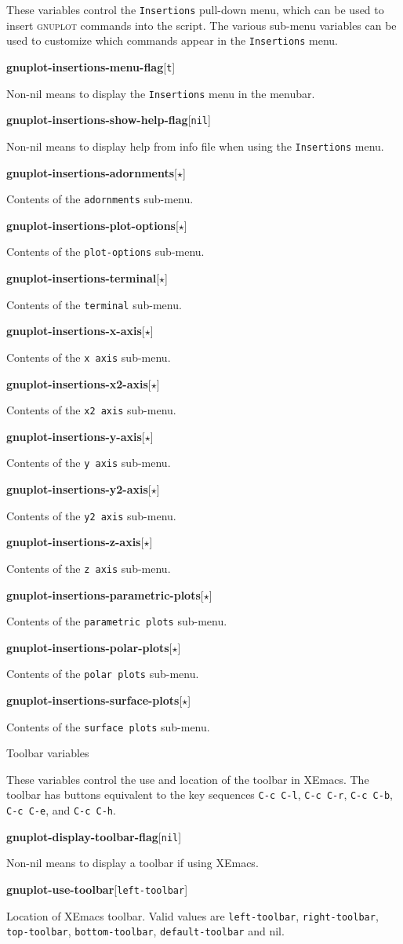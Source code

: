 \documentclass[twocolumn]{article}
\newenvironment{Boxedminipage}%
{\begin{Sbox}\begin{minipage}}%
  {\end{minipage}\end{Sbox}\Ovalbox{\TheSbox}}
\def\variable#1#2#3{{
    \vspace{-0.2truecm}
    \begin{flushright}
      \begin{minipage}[h]{0.97\linewidth}
        \vspace{-0.2truecm}
        \textbf{#1}\hfill[\texttt{#2}]
        \begin{flushright}
          \begin{minipage}[h]{0.93\linewidth}
            \vspace{-0.2truecm}
            #3
          \end{minipage}
        \end{flushright}
      \end{minipage}
    \end{flushright}
    }}
\def\Star{{$\star$}}
\begin{document}
\noindent These variables control the \texttt{Insertions} pull-down
menu, which can be used to insert \textsc{gnuplot} commands into the
script.  The various sub-menu variables can be used to customize which
commands appear in the \texttt{Insertions} menu.

\vspace{2ex}
%
\variable{gnuplot-insertions-menu-flag}{t}{Non-nil means to display
  the \texttt{Insertions} menu in the menubar.}
%
\variable{gnuplot-insertions-show-help-flag}{nil}{Non-nil means to
  display help from info file when using the \texttt{Insertions}
  menu.}
%
\variable{gnuplot-insertions-adornments}{\Star}{Contents of the
  \texttt{adornments} sub-menu.}
%
\variable{gnuplot-insertions-plot-options}{\Star}{Contents of the
  \texttt{plot-options} sub-menu.}
%
\variable{gnuplot-insertions-terminal}{\Star}{Contents of the
  \texttt{terminal} sub-menu.}
%
\variable{gnuplot-insertions-x-axis}{\Star}{Contents of the \texttt{x
    axis} sub-menu.}
%
\variable{gnuplot-insertions-x2-axis}{\Star}{Contents of the \texttt{x2
    axis} sub-menu.}
%
\variable{gnuplot-insertions-y-axis}{\Star}{Contents of the \texttt{y
    axis} sub-menu.}
%
\variable{gnuplot-insertions-y2-axis}{\Star}{Contents of the \texttt{y2
    axis} sub-menu.}
%
\variable{gnuplot-insertions-z-axis}{\Star}{Contents of the \texttt{z
    axis} sub-menu.}
%
\variable{gnuplot-insertions-parametric-plots}{\Star}{Contents of the
  \texttt{parametric plots} sub-menu.}
%
\variable{gnuplot-insertions-polar-plots}{\Star}{Contents of the
  \texttt{polar plots} sub-menu.}
%
\variable{gnuplot-insertions-surface-plots}{\Star}{Contents of the
  \texttt{surface plots} sub-menu.}



\begin{center}
  \begin{Boxedminipage}{0.75\linewidth}
    \begin{center}
      {\large Toolbar variables}
    \end{center}
  \end{Boxedminipage}
\end{center}

\noindent These variables control the use and location of the
toolbar in XEmacs.  The toolbar has buttons equivalent to the key
sequences \texttt{C-c C-l}, \texttt{C-c C-r}, \texttt{C-c C-b},
\texttt{C-c C-e}, and \texttt{C-c C-h}.

\vspace{2ex}

%
\variable{gnuplot-display-toolbar-flag}{nil}{Non-nil means to display
  a toolbar if using XEmacs.}
%
\variable{gnuplot-use-toolbar}{left-toolbar}{Location of XEmacs
  toolbar.  Valid values are \texttt{left-toolbar},
  \texttt{right-toolbar}, \texttt{top-toolbar}, \texttt{bottom-toolbar},
  \texttt{default-toolbar} and nil.}
%
\end{document}
